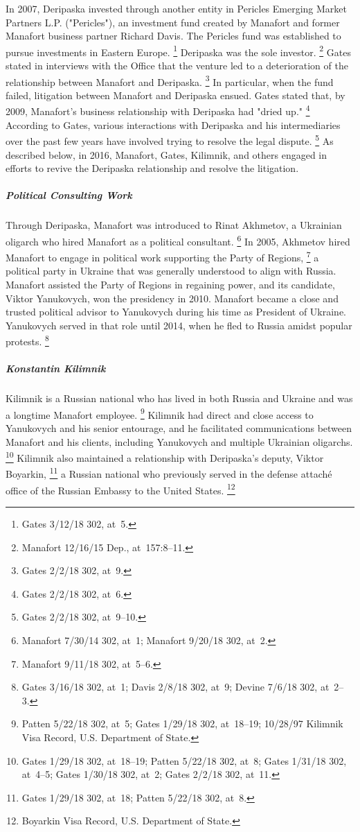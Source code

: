 In 2007, Deripaska invested through another entity in Pericles Emerging Market Partners L.P. ("Pericles"), an investment fund created by Manafort and former Manafort business partner Richard Davis.
The Pericles fund was established to pursue investments in Eastern Europe.%
\footnote{Gates 3/12/18 302, at~5.}
Deripaska was the sole investor.%
\footnote{Manafort 12/16/15 Dep., at~157:8--11.}
Gates stated in interviews with the Office that the venture led to a deterioration of the relationship between Manafort and Deripaska.%
\footnote{Gates 2/2/18 302, at~9.}
In particular, when the fund failed, litigation between Manafort and Deripaska ensued.
Gates stated that, by 2009, Manafort's business relationship with Deripaska had "dried up."%
\footnote{Gates 2/2/18 302, at~6.}
According to Gates, various interactions with Deripaska and his intermediaries over the past few years have involved trying to resolve the legal dispute.%
\footnote{Gates 2/2/18 302, at~9--10.}
As described below, in 2016, Manafort, Gates, Kilimnik, and others engaged in efforts to revive the Deripaska relationship and resolve the litigation.

\subparagraph{Political Consulting Work}

Through Deripaska, Manafort was introduced to Rinat Akhmetov, a Ukrainian oligarch who hired Manafort as a political consultant.%
\footnote{Manafort 7/30/14 302, at~1;
Manafort 9/20/18 302, at~2.}
In 2005, Akhmetov hired Manafort to engage in political work supporting the Party of Regions,%
\footnote{Manafort 9/11/18 302, at~5--6.}
a political party in Ukraine that was generally understood to align with Russia.
Manafort assisted the Party of Regions in regaining power, and its candidate, Viktor Yanukovych, won the presidency in 2010.
Manafort became a close and trusted political advisor to Yanukovych during his time as President of Ukraine.
Yanukovych served in that role until 2014, when he fled to Russia amidst popular protests.%
\footnote{Gates 3/16/18 302, at~1;
Davis 2/8/18 302, at~9;
Devine 7/6/18 302, at~2--3.}

\subparagraph{Konstantin Kilimnik}

Kilimnik is a Russian national who has lived in both Russia and Ukraine and was a longtime Manafort employee.%
\footnote{Patten 5/22/18 302, at~5;
Gates 1/29/18 302, at~18--19;
10/28/97 Kilimnik Visa Record, U.S. Department of State.}
Kilimnik had direct and close access to Yanukovych and his senior entourage, and he facilitated communications between Manafort and his clients, including Yanukovych and multiple Ukrainian oligarchs.%
\footnote{Gates 1/29/18 302, at~18--19;
Patten 5/22/18 302, at~8;
Gates 1/31/18 302, at~4--5;
Gates 1/30/18 302, at~2;
Gates 2/2/18 302, at~11.}
Kilimnik also maintained a relationship with Deripaska's deputy, Viktor Boyarkin,%
\footnote{Gates 1/29/18 302, at~18;
Patten 5/22/18 302, at~8.}
a Russian national who previously served in the defense attaché office of the Russian Embassy to the United States.%
\footnote{Boyarkin Visa Record, U.S. Department of State.}

